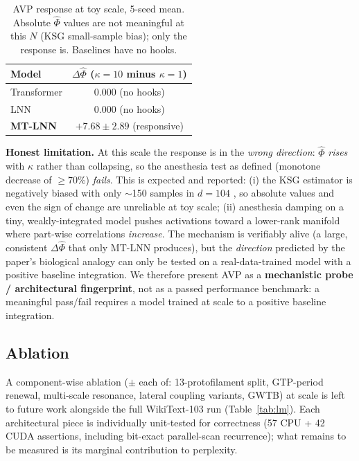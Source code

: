 \documentclass[11pt]{article}
\theoremstyle{definition}
\begin{document}
\begin{table}[h]
\centering
\caption{AVP response at toy scale, 5-seed mean. Absolute $\hat{\Phi}$ values are not meaningful at this $N$ (KSG small-sample bias); only the response is. Baselines have no hooks.}
\label{tab:anesth}
\begin{tabular}{lc}
\toprule
Model & $\Delta\hat{\Phi}$ ($\kappa{=}10$ minus $\kappa{=}1$) \\
\midrule
Transformer  & $0.000$ (no hooks) \\
LNN          & $0.000$ (no hooks) \\
\textbf{MT-LNN} & $\mathbf{+7.68 \pm 2.89}$ (responsive) \\
\bottomrule
\end{tabular}
\end{table}

\textbf{Honest limitation.} At this scale the response is in the \emph{wrong direction}: $\hat{\Phi}$ \emph{rises} with $\kappa$ rather than collapsing, so the anesthesia test as defined (monotone decrease of $\ge$70\%) \emph{fails}. This is expected and reported: (i) the KSG estimator is negatively biased with only $\sim$150 samples in $d{=}104$ \citep{lord2018geometric}, so absolute values and even the sign of change are unreliable at toy scale; (ii) anesthesia damping on a tiny, weakly-integrated model pushes activations toward a lower-rank manifold where part-wise correlations \emph{increase}. The mechanism is verifiably alive (a large, consistent $\Delta\hat{\Phi}$ that only MT-LNN produces), but the \emph{direction} predicted by the paper's biological analogy can only be tested on a real-data-trained model with a positive baseline integration. We therefore present AVP as a \textbf{mechanistic probe / architectural fingerprint}, not as a passed performance benchmark: a meaningful pass/fail requires a model trained at scale to a positive baseline integration.

\subsection{Ablation}

A component-wise ablation ($\pm$ each of: 13-protofilament split, GTP-period renewal, multi-scale resonance, lateral coupling variants, GWTB) at scale is left to future work alongside the full WikiText-103 run (Table~\ref{tab:lm}). Each architectural piece is individually unit-tested for correctness (57 CPU + 42 CUDA assertions, including bit-exact parallel-scan recurrence); what remains to be measured is its marginal contribution to perplexity.
\end{document}
